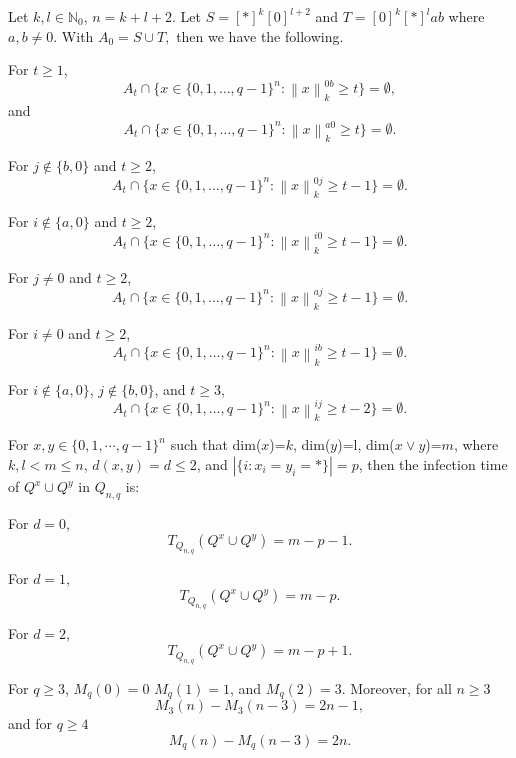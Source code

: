 \documentclass[10pt,a4paper]{amsart}
\renewcommand{\geq}{\geqslant}
\renewcommand{\leq}{\leqslant}
\begin{document}
\begin{lemma} \label{lemma:ST6}
Let $k,l \in \mathbb{N}_0$, $n=k+l+2$. Let $S=[*]^k[0]^{l+2}$ and $T=[0]^k[*]^lab$ where $a,b \neq 0$. With $A_0=S \cup T,$ then we have the following. 

For $t \geq 1$,
$$A_t \cap \{x \in \{0,1,\dots,q-1\}^n: \left \lVert x \right \rVert_k^{0b} \geq t\}=\emptyset,$$
and 
$$A_t \cap \{x \in \{0,1,\dots,q-1\}^n: \left \lVert x \right \rVert_k^{a0} \geq t\}=\emptyset.$$

For $j \notin \{b,0\}$ and $t \geq 2$,
$$A_t \cap \{x \in \{0,1,\dots,q-1\}^n: \left \lVert x \right \rVert_k^{0j} \geq t-1\}=\emptyset.$$

For $i \notin \{a,0\}$ and $t \geq 2$,
$$A_t \cap \{x \in \{0,1,\dots,q-1\}^n: \left \lVert x \right \rVert_k^{i0} \geq t-1\}=\emptyset.$$

For $j \neq 0$ and $t \geq 2$,
$$A_t \cap \{x \in \{0,1,\dots,q-1\}^n: \left \lVert x \right \rVert_k^{aj} \geq t-1\}=\emptyset.$$

For $i \neq 0$ and $t \geq 2$,
$$A_t \cap \{x \in \{0,1,\dots,q-1\}^n: \left \lVert x \right \rVert_k^{ib} \geq t-1\}=\emptyset.$$

For $i \notin \{a,0\}$, $j \notin \{b,0\}$, and $t \geq 3$, 
$$A_t \cap \{x \in \{0,1,\dots,q-1\}^n: \left \lVert x \right \rVert_k^{ij} \geq t-2\}=\emptyset.$$

\end{lemma}

\begin{lemma} \label{lemma:summary}
For $x,y \in \{0,1,\cdots,q-1\}^n$ such that dim($x$)=$k$, dim($y$)=l, dim($x \vee y$)=$m$, where $k,l <m \leq n$, $d(x,y)=d \leq 2$, and $|\{i: x_i=y_i=* \}|=p$, then the infection time of $Q^x \cup Q^y$ in $Q_{n,q}$ is:

For $d=0$, $$T_{Q_{n,q}}(Q^x \cup Q^y)=m-p-1.$$

For $d=1$, $$T_{Q_{n,q}}(Q^x \cup Q^y)=m-p.$$

For $d=2$, $$T_{Q_{n,q}}(Q^x \cup Q^y)=m-p+1.$$
\end{lemma}

\begin{theorem}
For $q \geq 3$, $M_q(0)=0$ $M_q(1)=1$, and $M_q(2)=3$. Moreover,  for all $n \geq 3$
$$M_3(n)-M_3(n-3)=2n-1,$$
and for $q \geq 4$
$$M_q(n)-M_q(n-3)=2n.$$
\end{theorem}
\end{document}
